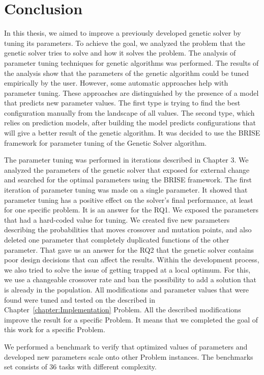 \chapter{Conclusion}
\label{chapter:conclusion}
In this thesis, we aimed to improve a previously developed genetic solver by tuning its parameters. To achieve the goal, we analyzed the problem that the genetic solver tries to solve and how it solves the problem. The analysis of parameter tuning techniques for genetic algorithms was performed. The results of the analysis show that the parameters of the genetic algorithm could be tuned empirically by the user. However, some automatic approaches help with parameter tuning. These approaches are distinguished by the presence of a model that predicts new parameter values. The first type is trying to find the best configuration manually from the landscape of all values. The second type, which relies on prediction models, after building the model predicts configurations that will give a better result of the genetic algorithm. It was decided to use the BRISE framework for parameter tuning of the Genetic Solver algorithm.

The parameter tuning was performed in iterations described in Chapter 3. We analyzed the parameters of the genetic solver that exposed for external change and searched for the optimal parameters using the BRISE framework.
The first iteration of parameter tuning was made on a single parameter. It showed that parameter tuning has a positive effect on the solver's final performance, at least for one specific problem. It is an answer for the RQ1.
We exposed the parameters that had a hard-coded value for tuning. We created five new parameters describing the probabilities that moves crossover and mutation points, and also deleted one parameter that completely duplicated functions of the other parameter. That gave us an answer for the RQ2 that the genetic solver contains poor design decisions that can affect the results.
Within the development process, we also tried to solve the issue of getting trapped at a local optimum.  For this, we use a changeable crossover rate and ban the possibility to add a solution that is already in the population.
All modifications and parameter values that were found were tuned and tested on the described in Chapter~\ref{chapter:Implementation} Problem.
All the described modifications improve the result for a specific Problem. It means that we completed the goal of this work for a specific Problem.

We performed a benchmark to verify that optimized values of parameters and developed new parameters scale onto other Problem instances. The benchmarks set consists of 36 tasks with different complexity. 

